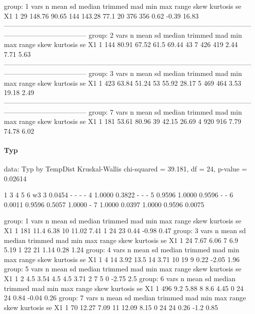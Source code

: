 \documentclass[a4paper,headsepline,footsepline,fontsize=11pt,BCOR=12mm,DIV=12]{report}
\begin{document}
group: 1
   vars  n   mean    sd median trimmed  mad min max range skew kurtosis    se
X1    1 29 148.76 90.65    144  143.28 77.1  20 376   356 0.62    -0.39 16.83
------------------------------------------------------------------------------------------------------------------------------------------------ 
group: 2
   vars   n  mean    sd median trimmed mad min max range skew kurtosis   se
X1    1 144 80.91 67.52   61.5   69.44  43   7 426   419 2.44     7.71 5.63
------------------------------------------------------------------------------------------------------------------------------------------------ 
group: 3
   vars   n  mean    sd median trimmed   mad min max range skew kurtosis   se
X1    1 423 63.84 51.24     53   55.92 28.17   5 469   464 3.53    19.18 2.49
------------------------------------------------------------------------------------------------------------------------------------------------ 
group: 7
   vars   n  mean    sd median trimmed   mad min max range skew kurtosis   se
X1    1 181 53.61 80.96     39   42.15 26.69   4 920   916 7.79    74.78 6.02

\paragraph{Typ}

data:  Typ by TempDist
Kruskal-Wallis chi-squared = 39.181, df = 24, p-value = 0.02614

  1      3      4      5      6  w3   
3 0.0454 -      -      -      -     
4 1.0000 0.3822 -      -      -     
5 0.9596 1.0000 0.9596 -      -     
6 0.0011 0.9596 0.5057 1.0000 -     
7 1.0000 0.0397 1.0000 0.9596 0.0075

group: 1
   vars   n mean   sd median trimmed  mad min max range skew kurtosis   se
X1    1 181 11.4 6.38     10   11.02 7.41   1  24    23 0.44    -0.98 0.47
group: 3
   vars  n mean   sd median trimmed  mad min max range skew kurtosis   se
X1    1 24 7.67 6.06      7     6.9 5.19   1  22    21 1.14     0.28 1.24
group: 4
   vars n mean   sd median trimmed  mad min max range skew kurtosis   se
X1    1 4   14 3.92   13.5      14 3.71  10  19     9 0.22    -2.05 1.96
group: 5
   vars n mean   sd median trimmed  mad min max range skew kurtosis  se
X1    1 2  4.5 3.54    4.5     4.5 3.71   2   7     5    0    -2.75 2.5
group: 6
   vars   n mean   sd median trimmed  mad min max range skew kurtosis   se
X1    1 496  9.2 5.88      8     8.6 4.45   0  24    24 0.84    -0.04 0.26
group: 7
   vars  n  mean   sd median trimmed  mad min max range skew kurtosis   se
X1    1 70 12.27 7.09     11   12.09 8.15   0  24    24 0.26     -1.2 0.85
\end{document}
